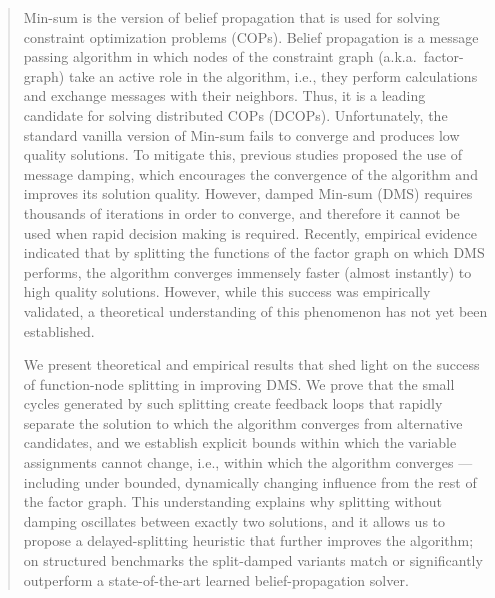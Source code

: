 \begin{abstract}
Min-sum is the version of belief propagation that is used for solving constraint optimization problems (COPs). Belief propagation is a message passing algorithm in which nodes of the constraint graph (a.k.a.\ factor-graph) take an active role in the algorithm, i.e., they perform calculations and exchange messages with their neighbors. Thus, it is a leading candidate for solving distributed COPs (DCOPs). Unfortunately, the standard vanilla version of Min-sum fails to converge and produces low quality solutions. To mitigate this, previous studies proposed the use of message damping, which encourages the convergence of the algorithm and improves its solution quality. However, damped Min-sum (DMS) requires thousands of iterations in order to converge, and therefore it cannot be used when rapid decision making is required.
Recently, empirical evidence indicated that by splitting the functions of the factor graph on which DMS performs, the algorithm converges immensely faster (almost instantly) to high quality solutions. However, while this success was empirically validated, a theoretical understanding of this phenomenon has not yet been established.

We present theoretical and empirical results that shed light on the success of function-node splitting in improving DMS. We prove that the small cycles generated by such splitting create feedback loops that rapidly separate the solution to which the algorithm converges from alternative candidates, and we establish explicit bounds within which the variable assignments cannot change, i.e., within which the algorithm converges --- including under bounded, dynamically changing influence from the rest of the factor graph. This understanding explains why splitting without damping oscillates between exactly two solutions, and it allows us to propose a delayed-splitting heuristic that further improves the algorithm; on structured benchmarks the split-damped variants match or significantly outperform a state-of-the-art learned belief-propagation solver.
\end{abstract}
\begin{links}
\end{links}
